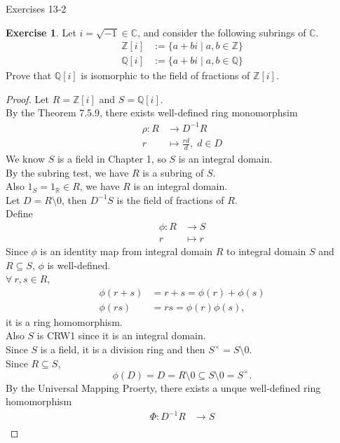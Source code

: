 \documentclass{article}
\newcommand{\bbr}{\mathbb{R}}
\newcommand{\bbc}{\mathbb{C}}
\newcommand{\bbz}{\mathbb{Z}}
\newcommand{\bbq}{\mathbb{Q}}
\theoremstyle{plain}
\theoremstyle{definition}
\newtheorem{exer}[lem]{Exercise}
\begin{document}
\newpage
\noindent Exercises 13-2\\
\begin{exer}
Let $i=\sqrt{-1}\in\bbc$, and consider the following subrings of $\bbc$.
\begin{align*}
\bbz[i]&:=\{a+bi\mid a,b\in\bbz\}
\\
\bbq[i]&:=\{a+bi\mid a,b\in\bbq\}
\end{align*}
Prove that $\bbq[i]$ is isomorphic to the field of fractions of $\bbz[i]$.
\begin{proof}
    Let $R = \bbz[i]$ and $S = \bbq[i]$.\\
    By the Theorem 7.5.9, there exists well-defined ring monomorphsim 
    \begin{align*}
        \rho: R &\to D^{-1}R \\
        r &\mapsto \frac{rd}{d} ,\; d\in D
    \end{align*}
    We know $S$ is a field in Chapter 1, so $S$ is an integral domain.\\
    By the subring test, we have $R$ is a subring of $S$.\\
    Also $1_S = 1_\bbr \in R$, we have $R$ is an integral domain.\\
    Let $D = R\setminus 0$, then $D^{-1}S$ is the field of fractions of $R$.\\
   Define
   \begin{align*}
       \phi: R &\to S \\
             r &\mapsto r
   \end{align*}
   Since $\phi$ is an identity map from integral domain $R$ to integral domain $S$ and  $R \subseteq S$, $\phi$ is well-defined.\\
   $\forall \ r,s \in R$,
   \begin{align*}
       \phi(r+s) &= r+s = \phi(r) +\phi(s)\\
       \phi(rs) &=rs = \phi(r)\phi(s),
   \end{align*}
   it is a ring homomorphism.\\
   Also $S$ is CRW1 since it is an integral domain.\\
   Since $S$ is a field, it is a division ring and then $S^{\times} = S\setminus 0$.\\
   Since $R \subseteq S$,
   \[\phi(D) = D = R\setminus 0 \subseteq S\setminus 0 = S^{\times}.\]    By the Universal Mapping Proerty, there exists a unque well-defined ring homomorphism 
   \begin{align*}
       \Phi:D^{-1}R &\to S\\

\end{align*}
\end{proof}
\end{exer}
\end{document}
